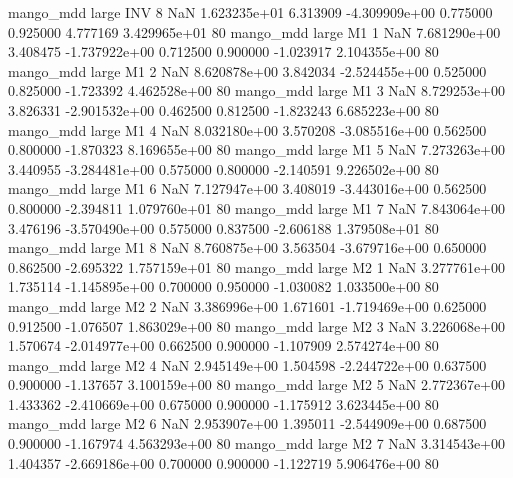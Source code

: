         mango_mdd      large      INV                 8                  NaN 1.623235e+01      6.313909 -4.309909e+00 0.775000 0.925000       4.777169 3.429965e+01 80
        mango_mdd      large       M1                 1                  NaN 7.681290e+00      3.408475 -1.737922e+00 0.712500 0.900000      -1.023917 2.104355e+00 80
        mango_mdd      large       M1                 2                  NaN 8.620878e+00      3.842034 -2.524455e+00 0.525000 0.825000      -1.723392 4.462528e+00 80
        mango_mdd      large       M1                 3                  NaN 8.729253e+00      3.826331 -2.901532e+00 0.462500 0.812500      -1.823243 6.685223e+00 80
        mango_mdd      large       M1                 4                  NaN 8.032180e+00      3.570208 -3.085516e+00 0.562500 0.800000      -1.870323 8.169655e+00 80
        mango_mdd      large       M1                 5                  NaN 7.273263e+00      3.440955 -3.284481e+00 0.575000 0.800000      -2.140591 9.226502e+00 80
        mango_mdd      large       M1                 6                  NaN 7.127947e+00      3.408019 -3.443016e+00 0.562500 0.800000      -2.394811 1.079760e+01 80
        mango_mdd      large       M1                 7                  NaN 7.843064e+00      3.476196 -3.570490e+00 0.575000 0.837500      -2.606188 1.379508e+01 80
        mango_mdd      large       M1                 8                  NaN 8.760875e+00      3.563504 -3.679716e+00 0.650000 0.862500      -2.695322 1.757159e+01 80
        mango_mdd      large       M2                 1                  NaN 3.277761e+00      1.735114 -1.145895e+00 0.700000 0.950000      -1.030082 1.033500e+00 80
        mango_mdd      large       M2                 2                  NaN 3.386996e+00      1.671601 -1.719469e+00 0.625000 0.912500      -1.076507 1.863029e+00 80
        mango_mdd      large       M2                 3                  NaN 3.226068e+00      1.570674 -2.014977e+00 0.662500 0.900000      -1.107909 2.574274e+00 80
        mango_mdd      large       M2                 4                  NaN 2.945149e+00      1.504598 -2.244722e+00 0.637500 0.900000      -1.137657 3.100159e+00 80
        mango_mdd      large       M2                 5                  NaN 2.772367e+00      1.433362 -2.410669e+00 0.675000 0.900000      -1.175912 3.623445e+00 80
        mango_mdd      large       M2                 6                  NaN 2.953907e+00      1.395011 -2.544909e+00 0.687500 0.900000      -1.167974 4.563293e+00 80
        mango_mdd      large       M2                 7                  NaN 3.314543e+00      1.404357 -2.669186e+00 0.700000 0.900000      -1.122719 5.906476e+00 80
